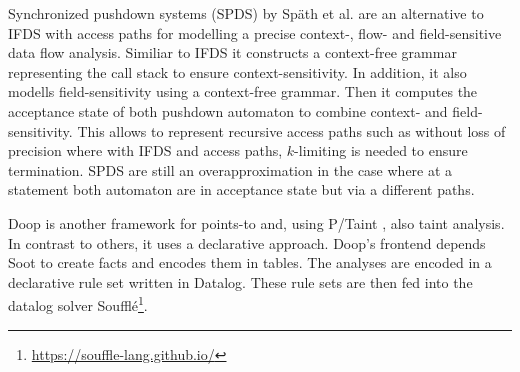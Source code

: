 \documentclass[../draft.tex]{subfiles}
\begin{document}
    Synchronized pushdown systems (SPDS) by Späth et al.\cite{Spaeth2019} are an alternative to IFDS with access paths for modelling a precise context-, flow- and field-sensitive data flow analysis. Similiar to IFDS it constructs a context-free grammar representing the call stack to ensure context-sensitivity. In addition, it also modells field-sensitivity using a context-free grammar. Then it computes the acceptance state of both pushdown automaton to combine context- and field-sensitivity. This allows to represent recursive access paths such as  without loss of precision where with IFDS and access paths, $k$-limiting is needed to ensure termination. SPDS are still an overapproximation in the case where at a statement both automaton are in acceptance state but via a different paths.

    Doop \cite{Bravenboer2009} is another framework for points-to and, using P/Taint \cite{Grech2017}, also taint analysis. In contrast to others, it uses a declarative approach. Doop's frontend depends Soot to create facts and encodes them in tables. The analyses are encoded in a declarative rule set written in Datalog. These rule sets are then fed into the datalog solver Soufflé\footnote{\url{https://souffle-lang.github.io/}}.
\end{document}
